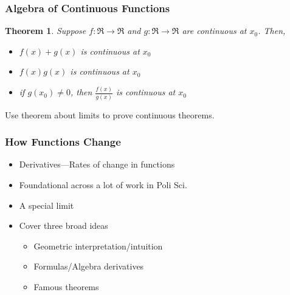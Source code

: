 \documentclass{beamer}
\newtheorem{thm}{Theorem}
\numberwithin{equation}{section}
\begin{document}
\begin{frame}
\frametitle{Algebra of Continuous Functions}

\begin{thm} Suppose $f:\Re \rightarrow \Re$ and $g:\Re \rightarrow \Re$ are continuous at $x_{0}$.  Then, 
\begin{itemize}
\item[i.)] $f(x) + g(x)$ is continuous at $x_{0}$
\item[ii.)] $f(x) g(x)$ is continuous at $x_{0}$
\item[iii.] if $g(x_0) \neq 0$, then $\frac{f(x) } {g(x) } $ is continuous at $x_{0}$ 
\end{itemize}
\end{thm}

Use theorem about limits to prove continuous theorems.  

\end{frame}

\begin{frame}

\begin{center}
\end{center}

\end{frame}


\begin{frame}
\frametitle{How Functions Change}

\begin{itemize}
\item[-] \alert{Derivatives}---Rates of change in functions
\item[-] Foundational across a lot of work in Poli Sci.
\item[-] A special \alert{limit}
\item[-] Cover three broad ideas 
\begin{itemize}
\item[-] Geometric interpretation/intuition
\item[-] Formulas/Algebra derivatives
\item[-] Famous theorems
\end{itemize}
\end{itemize}


 

\end{frame}
\end{document}
